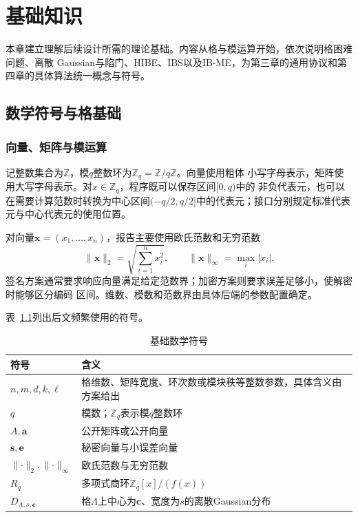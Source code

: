 \chapter{基础知识}

本章建立理解后续设计所需的理论基础。内容从格与模运算开始，依次说明格困难问题、离散
Gaussian与陷门、HIBE、IBS以及IB-ME，为第三章的通用协议和第四章的具体算法统一概念与符号。

\section{数学符号与格基础}

\subsection{向量、矩阵与模运算}

记整数集合为$\mathbb Z$，模$q$整数环为$\mathbb Z_q=\mathbb Z/q\mathbb Z$。向量使用粗体
小写字母表示，矩阵使用大写字母表示。对$x\in\mathbb Z_q$，程序既可以保存区间$[0,q)$中的
非负代表元，也可以在需要计算范数时转换为中心区间$(-q/2,q/2]$中的代表元；接口分别规定标准代表元与中心代表元的使用位置。

对向量$\mathbf x=(x_1,\ldots,x_n)$，报告主要使用欧氏范数和无穷范数
\[
 \lVert\mathbf x\rVert_2=\sqrt{\sum_{i=1}^{n}x_i^2},
 \qquad
 \lVert\mathbf x\rVert_\infty=\max_i|x_i|.
\]
签名方案通常要求响应向量满足给定范数界；加密方案则要求误差足够小，使解密时能够区分编码
区间。维数、模数和范数界由具体后端的参数配置确定。

表~\ref{tab:foundation-symbols}列出后文频繁使用的符号。

\begin{table}[H]
\centering\small
\caption{基础数学符号}
\label{tab:foundation-symbols}
\begin{tabularx}{\textwidth}{@{}p{}X@{}}
\toprule
\rowcolor{black!8} 符号 & 含义 \\
\midrule
$n,m,d,k,\ell$ & 格维数、矩阵宽度、环次数或模块秩等整数参数，具体含义由方案给出 \\
$q$ & 模数；$\mathbb Z_q$表示模$q$整数环 \\
$A,\mathbf a$ & 公开矩阵或公开向量 \\
$\mathbf s,\mathbf e$ & 秘密向量与小误差向量 \\
$\lVert\cdot\rVert_2,\lVert\cdot\rVert_\infty$ & 欧氏范数与无穷范数 \\
$R_q$ & 多项式商环$\mathbb Z_q[x]/(f(x))$ \\
$D_{\Lambda,s,\mathbf c}$ & 格$\Lambda$上中心为$\mathbf c$、宽度为$s$的离散Gaussian分布 \\
\bottomrule
\end{tabularx}
\end{table}

